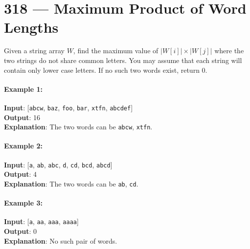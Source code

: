 \section{318 --- Maximum Product of Word Lengths}
Given a string array $ W $, find the maximum value of $ \lvert W[i]\rvert\times \lvert W[j]\rvert $ where the two strings do not share common letters. You may assume that each string will contain only lower case letters. If no such two words exist, return 0.

\paragraph{Example 1:}

\begin{flushleft}
\textbf{Input}: [\texttt{abcw}, \texttt{baz}, \texttt{foo}, \texttt{bar}, \texttt{xtfn}, \texttt{abcdef}]
\\
\textbf{Output}: 16
\\
\textbf{Explanation}: The two words can be \texttt{abcw}, \texttt{xtfn}.
\end{flushleft}

\paragraph{Example 2:}

\begin{flushleft}
\textbf{Input}: [\texttt{a}, \texttt{ab}, \texttt{abc}, \texttt{d}, \texttt{cd}, \texttt{bcd}, \texttt{abcd}]
\\
\textbf{Output}: 4 
\\
\textbf{Explanation}: The two words can be \texttt{ab}, \texttt{cd}.
\end{flushleft}

\paragraph{Example 3:}

\begin{flushleft}
\textbf{Input}: [\texttt{a}, \texttt{aa}, \texttt{aaa}, \texttt{aaaa}]
\\
\textbf{Output}: 0 
\\
\textbf{Explanation}: No such pair of words.
\end{flushleft}
